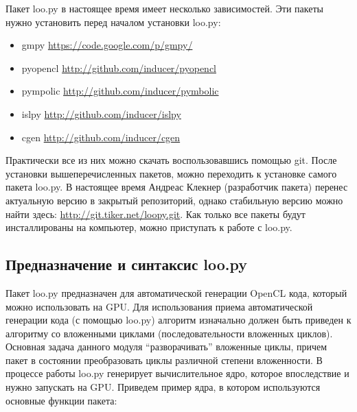 \documentclass{scrartcl}
\begin{document}
Пакет loo.py в настоящее время имеет несколько зависимостей. Эти пакеты нужно 
установить перед началом установки loo.py:
\begin{itemize}
\item gmpy \href{https://code.google.com/p/gmpy/}{https://code.google.com/p/gmpy/}
\item pyopencl \hyperref[http-github.com-inducer-pyopencl]{ http://github.com/inducer/pyopencl}
\item pympolic \href{http://github.com/inducer/pymbolic}{http://github.com/inducer/pymbolic}
\item islpy \href{http://github.com/inducer/islpy}{http://github.com/inducer/islpy}
\item cgen \href{http://github.com/inducer/cgen}{http://github.com/inducer/cgen}
\end{itemize}
Практически все из них можно скачать воспользовавшись помощью git. После 
установки вышеперечисленных пакетов, можно переходить к установке самого пакета loo.py.
В настоящее время Андреас Клекнер (разработчик пакета) перенес актуальную версию 
в закрытый репозиторий, однако стабильную версию можно найти здесь: \href{http://git.tiker.net/loopy.git}{http://git.tiker.net/loopy.git}.
Как только все пакеты будут инсталлированы на компьютер, можно приступать к работе с loo.py.
\subsection{Предназначение и синтаксис loo.py}
\label{sec-7-2}

Пакет loo.py предназначен для автоматической генерации OpenCL кода, который можно 
использовать на GPU. Для использования приема автоматической генерации кода 
(с помощью loo.py) алгоритм изначально должен быть приведен к алгоритму 
со вложенными циклами (последовательности вложенных циклов).
 Основная задача данного модуля ``разворачивать'' вложенные циклы,
причем пакет в состоянии преобразовать циклы различной степени вложенности. В
процессе работы loo.py генерирует вычислительное ядро, которое впоследствие и
нужно запускать на GPU. Приведем пример ядра, в котором используются основные функции
пакета:
\end{document}
